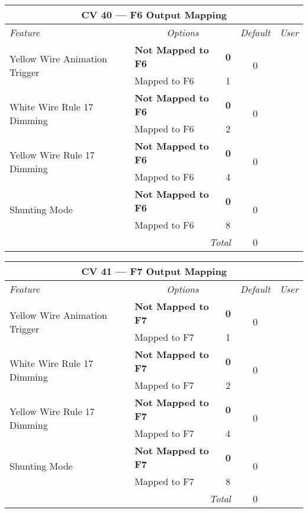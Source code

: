 \documentclass[12pt,letterpaper,draft]{memoir} %
\begin{document}
\label{CV40}
\begin{center}
\begin{tabular}{|l|lc|c|c|}
\hline
\multicolumn{5}{|c|}{\textbf{CV 40 --- F6 Output Mapping}} \\ \hline \hline
\textit{Feature} & \multicolumn{2}{c|}{\textit{Options}} & \textit{Default} & \textit{User} \\ \hline
\multirow{2}{*}{Yellow Wire Animation Trigger} & \textbf{Not Mapped to F6} & \textbf{0}	& 	\multirow{2}{*}{0}& \\
                           & Mapped to F6 & 1 & & \\ \hline
\multirow{2}{*}{White Wire Rule 17 Dimming} & \textbf{Not Mapped to F6} & \textbf{0}	& 	\multirow{2}{*}{0}& \\
                             & Mapped to F6 & 2 & & \\ \hline
\multirow{2}{*}{Yellow Wire Rule 17 Dimming} & \textbf{Not Mapped to F6} & \textbf{0}	& 	\multirow{2}{*}{0}&\\
                             & Mapped to F6 & 4 & & \\ \hline
\multirow{2}{*}{Shunting Mode} & \textbf{Not Mapped to F6} & \textbf{0}	& 	\multirow{2}{*}{0}&\\
                             & Mapped to F6 & 8 & & \\ \hline\hline
\multicolumn{3}{|r|}{\textit{Total}} & 0 &\\ \hline
\end{tabular}
\end{center}

\label{CV41}
\begin{center}
\begin{tabular}{|l|lc|c|c|}
\hline
\multicolumn{5}{|c|}{\textbf{CV 41 --- F7 Output Mapping}} \\ \hline \hline
\textit{Feature} & \multicolumn{2}{c|}{\textit{Options}} & \textit{Default} & \textit{User} \\ \hline
\multirow{2}{*}{Yellow Wire Animation Trigger} & \textbf{Not Mapped to F7} & \textbf{0}	& 	\multirow{2}{*}{0}& \\
                           & Mapped to F7 & 1 & & \\ \hline
\multirow{2}{*}{White Wire Rule 17 Dimming} & \textbf{Not Mapped to F7} & \textbf{0}	& 	\multirow{2}{*}{0}& \\
                             & Mapped to F7 & 2 & & \\ \hline
\multirow{2}{*}{Yellow Wire Rule 17 Dimming} & \textbf{Not Mapped to F7} & \textbf{0}	& 	\multirow{2}{*}{0}&\\
                             & Mapped to F7 & 4 & & \\ \hline
\multirow{2}{*}{Shunting Mode} & \textbf{Not Mapped to F7} & \textbf{0}	& 	\multirow{2}{*}{0}&\\
                             & Mapped to F7 & 8 & & \\ \hline\hline
\multicolumn{3}{|r|}{\textit{Total}} & 0 &\\ \hline
\end{tabular}
\end{center}
\end{document}
